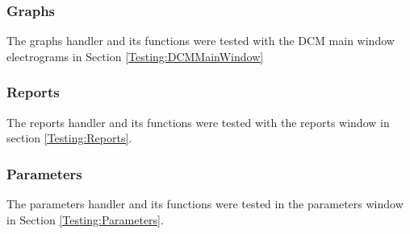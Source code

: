 \documentclass[12pt]{article}
\begin{document}
\subsubsection{Graphs}
The graphs handler and its functions were tested with the DCM main window electrograms in Section \ref{Testing:DCMMainWindow}

\subsubsection{Reports}
The reports handler and its functions were tested with the reports window in section \ref{Testing:Reports}.

\subsubsection{Parameters}
The parameters handler and its functions were tested in the parameters window in Section \ref{Testing:Parameters}.
\end{document}
